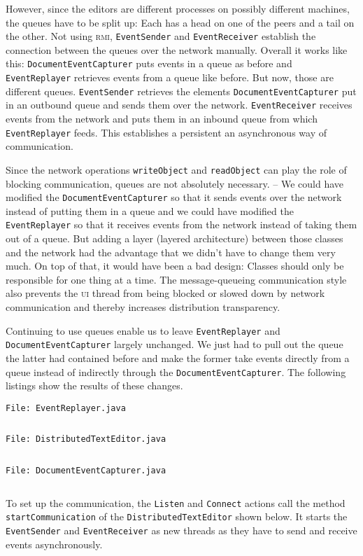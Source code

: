 \documentclass[a4paper,draft,12pt,oneside,article,table]{memoir}
\newcommand{\srcpath}{../ex09/src/main/java/ddist}
\newcommand{\inmnt}[3]{\vspace{1em}\noindent\texttt{\color{gray}File: #3}\vspace{-1em}\inputminted[tabsize=4,firstline=#1,firstnumber=#1,lastline=#2,linenos]{java}{\srcpath/#3}}
\newcommand{\mil}[1]{\texttt{#1}}
\begin{document}
However, since the editors are different processes on possibly
different machines, the queues have to be split up: Each has a head on
one of the peers and a tail on the other.  Not using \textsc{rmi},
\mil{EventSender} and \mil{EventReceiver} establish the connection
between the queues over the network manually. Overall it works like
this: \mil{DocumentEventCapturer} puts events in a queue as before and
\mil{EventReplayer} retrieves events from a queue like before. But
now, those are different queues.  \mil{EventSender} retrieves the
elements \mil{DocumentEventCapturer} put in an outbound queue and
sends them over the network.  \mil{EventReceiver} receives events from
the network and puts them in an inbound queue from which
\mil{EventReplayer} feeds. This establishes a persistent an
asynchronous way of communication.

Since the network operations \mil{writeObject} and \mil{readObject} can
play the role of blocking communication, queues are not absolutely
necessary. -- We could have modified the \mil{DocumentEventCapturer} so
that it sends events over the network instead of putting them in a queue
and we could have modified the \mil{EventReplayer} so that it receives
events from the network instead of taking them out of a queue. But
adding a layer (layered architecture) between those classes and the
network had the advantage that we didn't have to change them very much.
On top of that, it would have been a bad design: Classes should only be
responsible for one thing at a time. The message-queueing communication
style also prevents the \textsc{ui} thread from being blocked or slowed
down by network communication and thereby increases distribution
transparency.

Continuing to use queues enable us to leave \mil{EventReplayer} and
\mil{DocumentEventCapturer} largely unchanged. We just had to pull out
the queue the latter had contained before and make the former take
events directly from a queue instead of indirectly through the
\mil{DocumentEventCapturer}. The following listings show the results of
these changes.

\inmnt{1}{1000}{EventReplayer.java}

\inmnt{43}{67}{DistributedTextEditor.java}

\inmnt{30}{39}{DocumentEventCapturer.java}

To set up the communication, the \mil{Listen} and \mil{Connect} actions
call the method \mil{startCommunication} of the
\mil{DistributedTextEditor} shown below. It starts the \mil{EventSender}
and \mil{EventReceiver} as new threads as they have to send and receive
events asynchronously.
\end{document}

